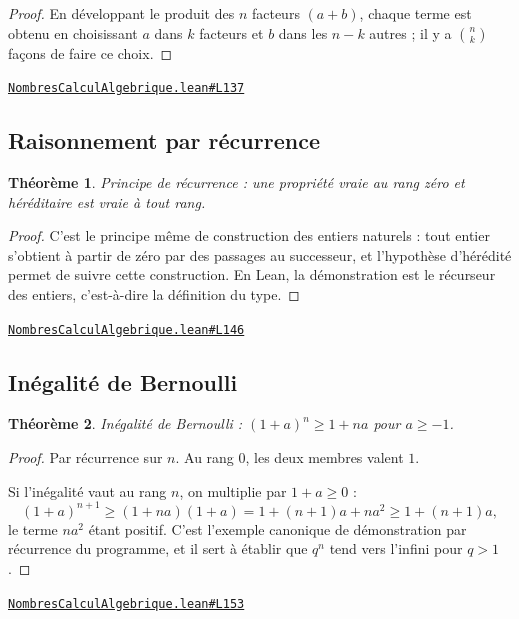 \documentclass[11pt,a4paper]{article}
\theoremstyle{definition}
\theoremstyle{plain}
\newtheorem{theoreme}{Théorème}
\newcommand{\source}[2]{\par\smallskip\noindent\hfill{\footnotesize\href{#1}{\texttt{#2}}}\par\smallskip}
\begin{document}
\begin{proof}
En développant le produit des $n$ facteurs $(a+b)$, chaque terme est obtenu en
choisissant $a$ dans $k$ facteurs et $b$ dans les $n-k$ autres ; il y a $\binom{n}{k}$
façons de faire ce choix.
\end{proof}
\source{https://github.com/Commutator-IO/learn-lean/blob/main/courses/02-lycee/01-nombres-calcul-algebrique/NombresCalculAlgebrique.lean\#L137}{NombresCalculAlgebrique.lean\#L137}

\subsection{Raisonnement par récurrence}

\begin{theoreme}
Principe de récurrence : une propriété vraie au rang zéro et héréditaire est vraie à
tout rang.
\end{theoreme}

\begin{proof}
C'est le principe même de construction des entiers naturels : tout entier s'obtient à
partir de zéro par des passages au successeur, et l'hypothèse d'hérédité permet de suivre
cette construction. En Lean, la démonstration est le récurseur des entiers, c'est-à-dire
la définition du type.
\end{proof}
\source{https://github.com/Commutator-IO/learn-lean/blob/main/courses/02-lycee/01-nombres-calcul-algebrique/NombresCalculAlgebrique.lean\#L146}{NombresCalculAlgebrique.lean\#L146}

\subsection{Inégalité de Bernoulli}

\begin{theoreme}
Inégalité de Bernoulli : $(1 + a)^n \ge 1 + na$ pour $a \ge -1$.
\end{theoreme}

\begin{proof}
Par récurrence sur $n$. Au rang $0$, les deux membres valent $1$.

Si l'inégalité vaut au rang $n$, on multiplie par $1 + a \ge 0$ :
\[ (1+a)^{n+1} \ge (1 + na)(1 + a) = 1 + (n+1)a + na^2 \ge 1 + (n+1)a , \]
le terme $na^2$ étant positif. C'est l'exemple canonique de démonstration par récurrence
du programme, et il sert à établir que $q^n$ tend vers l'infini pour $q > 1$.
\end{proof}
\source{https://github.com/Commutator-IO/learn-lean/blob/main/courses/02-lycee/01-nombres-calcul-algebrique/NombresCalculAlgebrique.lean\#L153}{NombresCalculAlgebrique.lean\#L153}
\end{document}
